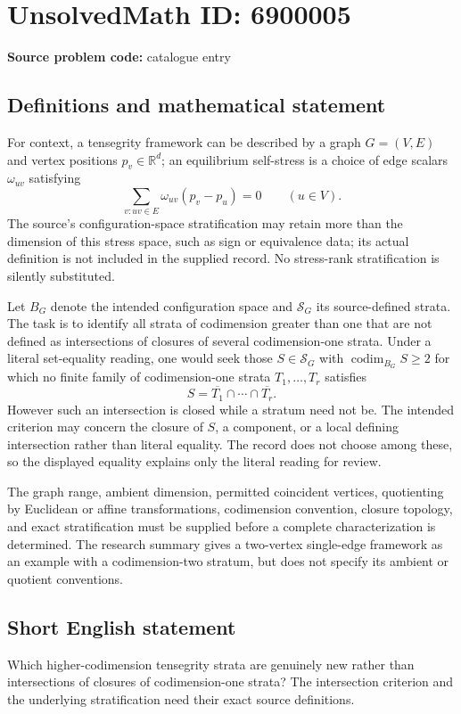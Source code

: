 \documentclass[11pt]{article}
\newcommand{\R}{\mathbb{R}}
\begin{document}
\section*{UnsolvedMath ID: 6900005}
\textbf{Source problem code:} catalogue entry
\subsection{Definitions and mathematical statement}
For context, a tensegrity framework can be described by a graph $G=(V,E)$ and vertex positions $p_v\in\R^d$; an equilibrium self-stress is a choice of edge scalars $\omega_{uv}$ satisfying
\[
 \sum_{v:uv\in E}\omega_{uv}(p_v-p_u)=0
 \qquad(u\in V).
\]
The source's configuration-space stratification may retain more than the dimension of this stress space, such as sign or equivalence data; its actual definition is not included in the supplied record. No stress-rank stratification is silently substituted.

Let $B_G$ denote the intended configuration space and $\mathcal S_G$ its source-defined strata. The task is to identify all strata of codimension greater than one that are not defined as intersections of closures of several codimension-one strata. Under a literal set-equality reading, one would seek those $S\in\mathcal S_G$ with $\operatorname{codim}_{B_G}S\ge2$ for which no finite family of codimension-one strata $T_1,\ldots,T_r$ satisfies
\[
 S=\overline{T_1}\cap\cdots\cap\overline{T_r}.
\]
However such an intersection is closed while a stratum need not be. The intended criterion may concern the closure of $S$, a component, or a local defining intersection rather than literal equality. The record does not choose among these, so the displayed equality explains only the literal reading for review.

The graph range, ambient dimension, permitted coincident vertices, quotienting by Euclidean or affine transformations, codimension convention, closure topology, and exact stratification must be supplied before a complete characterization is determined. The research summary gives a two-vertex single-edge framework as an example with a codimension-two stratum, but does not specify its ambient or quotient conventions.
\subsection{Short English statement}
Which higher-codimension tensegrity strata are genuinely new rather than intersections of closures of codimension-one strata? The intersection criterion and the underlying stratification need their exact source definitions.
\end{document}
